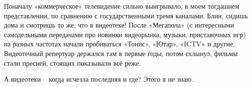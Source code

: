 Поначалу «коммерческое» телевидение сильно выигрывало, в моем тогдашнем представлении, по сравнению с государственными тремя каналами. Блин, сидишь дома и смотришь то же, что в видеотеке! После «Мегапола» (с интересными самодельными передачами про новинки видеорынка, музыки, приставочных игр) на разных частотах начали пробиваться «Тонис», «Ютар», «ICTV» и другие. Видеотечный репертуар держался там в первые годы, потом схлынул, фильмы стали пресней, стоящих показывали всё реже.

А видеотеки – когда исчезла последняя и где? Этого я не знаю.
